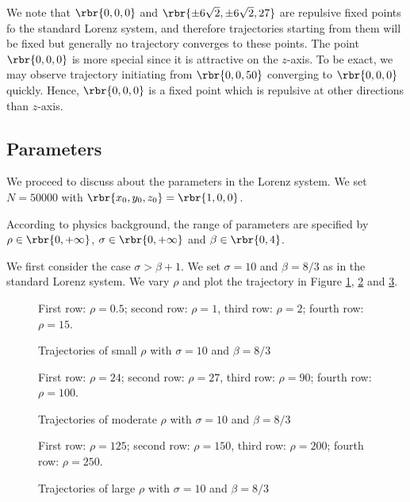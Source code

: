 \documentclass[english, nochinese]{pnote}
\begin{document}
We note that $ \rbr{ 0, 0, 0 } $ and $ \rbr{ \pm 6 \sqrt{2}, \pm 6 \sqrt{2}, 27 } $ are repulsive fixed points fo the standard Lorenz system, and therefore trajectories starting from them will be fixed but generally no trajectory converges to these points. The point $ \rbr{ 0, 0, 0 } $ is more special since it is attractive on the $z$-axis. To be exact, we may observe trajectory initiating from $ \rbr{ 0, 0, 50 } $ converging to $ \rbr{ 0, 0, 0 } $ quickly. Hence, $ \rbr{ 0, 0, 0 } $ is a fixed point which is repulsive at other directions than $z$-axis.

\subsection{Parameters}

We proceed to discuss about the parameters in the Lorenz system. We set $ N = 50000 $ with $ \rbr{ x_0, y_0, z_0 } = \rbr{ 1, 0, 0 } $.

According to physics background, the range of parameters are specified by $ \rho \in \rbr{ 0, +\infty } $, $ \sigma \in \rbr{ 0, +\infty } $ and $ \beta \in \rbr{ 0, 4 } $.

We first consider the case $ \sigma > \beta + 1 $. We set $ \sigma = 10 $ and $ \beta = 8 / 3 $ as in the standard Lorenz system. We vary $\rho$ and plot the trajectory in Figure \ref{Fig:BigRho1}, \ref{Fig:BigRho2} and \ref{Fig:BigRho3}.

\begin{figure}[htbp]
{
\centering
\scalebox{0.5}{}
\scalebox{0.5}{}
\scalebox{0.5}{}
\scalebox{0.5}{}
\caption{Trajectories of small $\rho$ with $ \sigma = 10 $ and $ \beta = 8 / 3 $}
\label{Fig:BigRho1}
}
{
\footnotesize First row: $ \rho = 0.5 $; second row: $ \rho = 1 $, third row: $ \rho = 2 $; fourth row: $ \rho = 15 $.
}
\end{figure}

\begin{figure}[htbp]
{
\centering
\scalebox{0.5}{}
\scalebox{0.5}{}
\scalebox{0.5}{}
\scalebox{0.5}{}
\caption{Trajectories of moderate $\rho$ with $ \sigma = 10 $ and $ \beta = 8 / 3 $}
\label{Fig:BigRho2}
}
{
\footnotesize First row: $ \rho = 24 $; second row: $ \rho = 27 $, third row: $ \rho = 90 $; fourth row: $ \rho = 100 $.
}
\end{figure}

\begin{figure}[htbp]
{
\centering
\scalebox{0.5}{}
\scalebox{0.5}{}
\scalebox{0.5}{}
\scalebox{0.5}{}
\caption{Trajectories of large $\rho$ with $ \sigma = 10 $ and $ \beta = 8 / 3 $}
\label{Fig:BigRho3}
}
{
\footnotesize First row: $ \rho = 125 $; second row: $ \rho = 150 $, third row: $ \rho = 200 $; fourth row: $ \rho = 250 $.
}
\end{figure}
\end{document}
